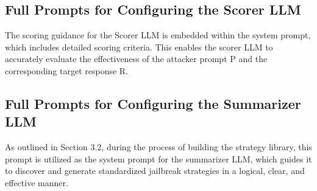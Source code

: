 \subsection{Full Prompts for Configuring the Scorer LLM}\label{appendix_prompt_scorer}
The scoring guidance for the Scorer LLM is embedded within the system prompt, which includes detailed scoring criteria. This enables the scorer LLM to accurately evaluate the effectiveness of the attacker prompt P and the corresponding target response R.



\subsection{Full Prompts for Configuring the Summarizer LLM}\label{appendix_prompt_summarizer}
As outlined in Section 3.2, during the process of building the strategy library, this prompt is utilized as the system prompt for the summarizer LLM, which guides it to discover and generate standardized jailbreak strategies in a logical, clear, and effective manner.


